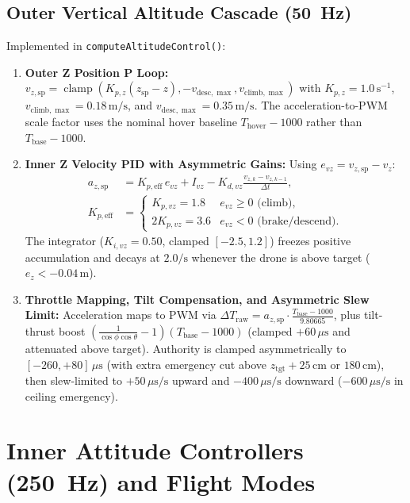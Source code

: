 \documentclass[11pt,a4paper]{article}
\begin{document}
\subsection{Outer Vertical Altitude Cascade (50~Hz)}
Implemented in \texttt{computeAltitudeControl()}:
\begin{enumerate}
  \item \textbf{Outer Z Position P Loop:} $v_{z,\text{sp}} = \operatorname{clamp}(K_{p,z}(z_{\text{sp}} - z), -v_{\text{desc},\max}, v_{\text{climb},\max})$ with $K_{p,z} = 1.0\,\text{s}^{-1}$, $v_{\text{climb},\max} = 0.18\,\text{m/s}$, and $v_{\text{desc},\max} = 0.35\,\text{m/s}$. The acceleration-to-PWM scale factor uses the nominal hover baseline $T_{\text{hover}} - 1000$ rather than $T_{\text{base}} - 1000$.
  \item \textbf{Inner Z Velocity PID with Asymmetric Gains:} Using $e_{vz} = v_{z,\text{sp}} - v_z$:
  \begin{align}
    a_{z,\text{sp}} &= K_{p,\text{eff}}\, e_{vz} + I_{vz} - K_{d,vz}\frac{v_{z,k} - v_{z,k-1}}{\Delta t}, \\
    K_{p,\text{eff}} &= \begin{cases} K_{p,vz} = 1.8 & e_{vz} \ge 0\text{ (climb)}, \\ 2 K_{p,vz} = 3.6 & e_{vz} < 0\text{ (brake/descend)}. \end{cases}
  \end{align}
  The integrator ($K_{i,vz} = 0.50$, clamped $[-2.5, 1.2]$) freezes positive accumulation and decays at $2.0/\text{s}$ whenever the drone is above target ($e_z < -0.04\,\text{m}$).
  \item \textbf{Throttle Mapping, Tilt Compensation, and Asymmetric Slew Limit:} Acceleration maps to PWM via $\Delta T_{\text{raw}} = a_{z,\text{sp}} \cdot \frac{T_{\text{base}} - 1000}{9.80665}$, plus tilt-thrust boost $\left(\frac{1}{\cos\phi\cos\theta}-1\right)(T_{\text{base}}-1000)$ (clamped $+60\,\mu\text{s}$ and attenuated above target). Authority is clamped asymmetrically to $[-260, +80]\,\mu\text{s}$ (with extra emergency cut above $z_{\text{tgt}}+25\,\text{cm}$ or $180\,\text{cm}$), then slew-limited to $+50\,\mu\text{s/s}$ upward and $-400\,\mu\text{s/s}$ downward ($-600\,\mu\text{s/s}$ in ceiling emergency).
\end{enumerate}

\section{Inner Attitude Controllers (250~Hz) and Flight Modes}
\end{document}
